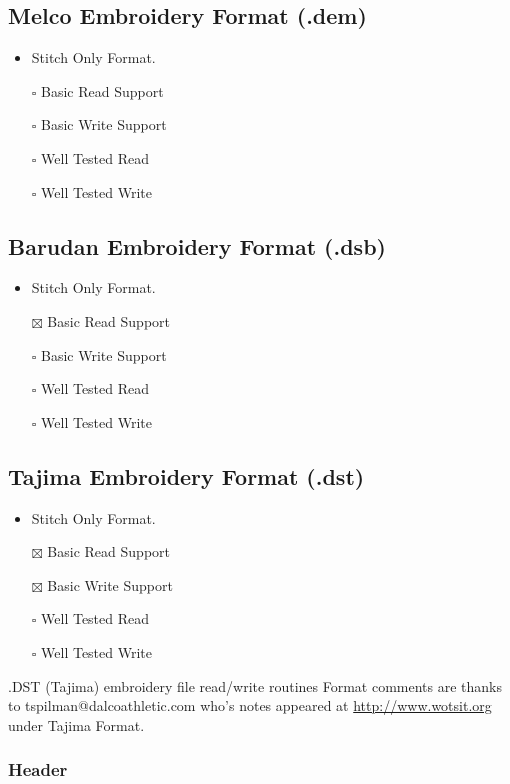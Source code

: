 \documentclass[onesize, a4paper]{refart}
\providecommand{\tightlist}{\setlength{\itemsep}{0pt}\setlength{\parskip}{0pt}}
\begin{document}
\subsection{Melco Embroidery Format (.dem)}

\begin{itemize}
\tightlist
\item Stitch Only Format.
\item[$\square$] Basic Read Support
\item[$\square$] Basic Write Support
\item[$\square$] Well Tested Read
\item[$\square$] Well Tested Write
\end{itemize}

\subsection{Barudan Embroidery Format (.dsb)}

\begin{itemize}
\tightlist
\item Stitch Only Format.
\item[$\boxtimes$] Basic Read Support
\item[$\square$] Basic Write Support
\item[$\square$] Well Tested Read
\item[$\square$] Well Tested Write
\end{itemize}

\subsection{Tajima Embroidery Format (.dst)}

\begin{itemize}
\tightlist
\item Stitch Only Format.
\item[$\boxtimes$] Basic Read Support
\item[$\boxtimes$] Basic Write Support
\item[$\square$] Well Tested Read
\item[$\square$] Well Tested Write
\end{itemize}

.DST (Tajima) embroidery file read/write routines
Format comments are thanks to tspilman@dalcoathletic.com who's
notes appeared at \url{http://www.wotsit.org} under Tajima Format.

\subsubsection{Header}
\end{document}
